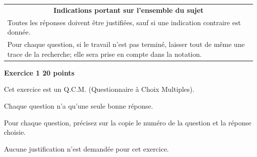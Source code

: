 \documentclass[11pt]{article}
\begin{document}
\begin{center}
\begin{tabularx}{\linewidth}{|X|}\hline
\multicolumn{1}{|c|}{\textbf{Indications portant sur l'ensemble du sujet}}\\
Toutes les réponses doivent être justifiées, sauf si une indication contraire est donnée.\\
Pour chaque question, si le travail n'est pas terminé, laisser tout de même une trace de la recherche; elle sera prise en compte dans la notation.\\ \hline
\end{tabularx}
\end{center}

\medskip

\textbf{Exercice 1 \hfill 20 points}

\medskip

Cet exercice est un Q.C.M. (Questionnaire à Choix Multiples).

Chaque question n'a qu'une seule bonne réponse.

Pour chaque question, précisez sur la copie le numéro de la question et la réponse choisie. 

Aucune justification n'est demandée pour cet exercice.
\end{document}
